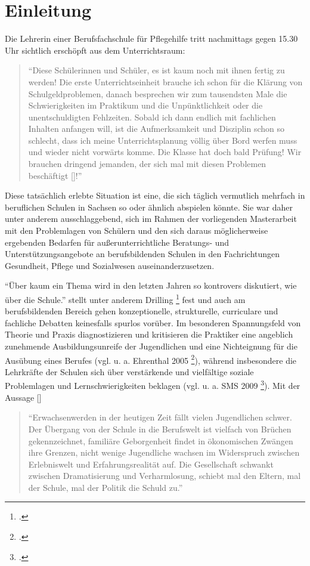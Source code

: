 \section{Einleitung}
\label{sec:Einleitung}

Die Lehrerin einer Berufsfachschule für Pflegehilfe tritt nachmittags gegen 15.30 Uhr sichtlich erschöpft aus dem Unterrichtsraum:
\begin{quotation}
\noindent
"`Diese Schülerinnen und Schüler, es ist kaum noch mit ihnen fertig zu werden! Die erste Unterrichtseinheit brauche ich schon für die Klärung von Schulgeldproblemen, danach besprechen wir zum tausendsten Male die Schwierigkeiten im Praktikum und die Unpünktlichkeit oder die unentschuldigten Fehlzeiten. Sobald ich dann endlich mit fachlichen Inhalten anfangen will, ist die Aufmerksamkeit und Disziplin schon so schlecht, dass ich meine Unterrichtsplanung völlig über Bord werfen muss und wieder nicht vorwärts komme. Die Klasse hat doch bald Prüfung! Wir brauchen dringend jemanden, der sich mal mit diesen Problemen beschäftigt [\punkte]!"'
\end{quotation}

\noindent
Diese tatsächlich erlebte Situation ist eine, die sich täglich vermutlich mehrfach in beruflichen Schulen in Sachsen so oder ähnlich abspielen könnte. Sie war daher unter anderem ausschlaggebend, sich im Rahmen der vorliegenden Masterarbeit mit den Problemlagen von Schülern und den sich daraus möglicherweise ergebenden Bedarfen für außerunterrichtliche Beratungs- und Unterstützungsangebote an berufsbildenden Schulen in den Fachrichtungen Gesundheit, Pflege und Sozialwesen auseinanderzusetzen. 

"`Über kaum ein Thema wird in den letzten Jahren so kontrovers diskutiert, wie über die Schule."' stellt unter anderem Drilling \footcite[9]{Drilling2004} fest und auch am berufsbildenden Bereich gehen konzeptionelle, strukturelle, curriculare und fachliche Debatten keinesfalls spurlos vorüber. Im besonderen Spannungsfeld von Theorie und Praxis diagnostizieren und kritisieren die Praktiker eine angeblich zunehmende Ausbildungsunreife der Jugendlichen und eine Nichteignung für die Ausübung eines Berufes (vgl. u. a. Ehrenthal 2005 \footcite[vgl.]{Ehrenthal2005}), während insbesondere die Lehrkräfte der Schulen sich über verstärkende und vielfältige soziale Problemlagen und Lernschwierigkeiten beklagen (vgl. u. a. SMS 2009 \footcite[vgl.][13]{SMSSS2009}). Mit der Aussage [\punkte]

\begin{quotation}
\noindent
"`Erwachsenwerden in der heutigen Zeit fällt vielen Jugendlichen schwer. Der Übergang von der Schule in die Berufswelt ist vielfach von Brüchen gekennzeichnet, familiäre Geborgenheit findet in ökonomischen Zwängen ihre Grenzen, nicht wenige Jugendliche wachsen im Widerspruch zwischen Erlebniswelt und Erfahrungsrealität auf. Die Gesellschaft schwankt zwischen Dramatisierung und Verharmlosung, schiebt mal den Eltern, mal der Schule, mal der Politik die Schuld zu."' 
\end{quotation}

